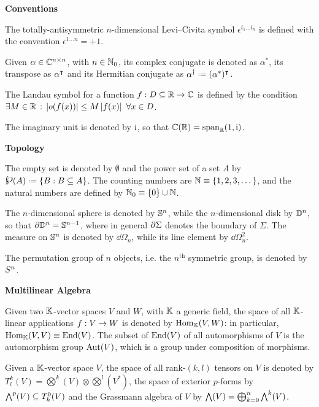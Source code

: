 
\textbf{\sffamily Conventions}

The totally-antisymmetric $ n $-dimensional Levi--Civita symbol $ \epsilon^{i_1 \dots i_n} $ is defined with the convention $ \epsilon^{1 \dots n} = +1 $.

Given $ \alpha \in \mathbb{C}^{n \times n} $, with $ n \in \mathbb{N}_0 $, its complex conjugate is denoted as $ \alpha^* $, its transpose as $ \alpha^\intercal $ and its Hermitian conjugate as $ \alpha\dg \defeq (\alpha^*)\tsp $.

The Landau symbol for a function $ f : D \subseteq \mathbb{R} \rightarrow \mathbb{C} $ is defined by the condition $ \exists M \in \mathbb{R} \,:\, \left\lvert o(f(x))\right\rvert \leq M \left\lvert f(x)\right\rvert \,\,\forall x \in D $.

The imaginary unit is denoted by $ \mathrm{i} $, so that $ \mathbb{C}(\mathbb{R}) = \operatorname{span}_{\mathbb{R}}(1,\mathrm{i}) $.

\textbf{\sffamily Topology}

The empty set is denoted by $ \emptyset $ and the power set of a set $ A $ by $ \pwst{A} \defeq \{B : B \ssq A\} $. The counting numbers are $ \mathbb{N} \equiv \{1,2,3,\dots\} $, and the natural numbers are defined by $ \mathbb{N}_0 \equiv \{0\} \cup \mathbb{N} $.

The $ n $-dimensional sphere is denoted by $ \mathbb{S}^{n} $, while the $ n $-dimensional disk by $ \mathbb{D}^{n} $, so that $ \partial \mathbb{D}^{n} = \mathbb{S}^{n-1} $, where in general $ \partial \Sigma $ denotes the boundary of $ \Sigma $. The measure on $ \mathbb{S}^{n} $ is denoted by $ \dd \Omega_n $, while its line element by $ \dd \Omega_n^2 $.

The permutation group of $ n $ objects, i.e. the $ n^\text{th} $ symmetric group, is denoted by $ S^{n} $.

\textbf{\sffamily Multilinear Algebra}

Given two $ \mathbb{K} $-vector spaces $ V $ and $ W $, with $ \mathbb{K} $ a generic field, the space of all $ \mathbb{K} $-linear applications $ f : V \rightarrow W $ is denoted by $ \operatorname{Hom}_{\mathbb{K}}(V,W) $: in particular, $ \operatorname{Hom}_{\mathbb{K}}(V , V) \equiv \operatorname{End}(V) $. The subset of $ \operatorname{End}(V) $ of all automorphisms of $ V $ is the automorphism group $ \operatorname{Aut}(V) $, which is a group under composition of morphisms.

Given a $ \mathbb{K} $-vector space $ V $, the space of all rank-$ (k,l) $ tensors on $ V $ is denoted by $ T^k_l(V) = \bigotimes^k (V) \otimes \bigotimes^l (V^*) $, the space of exterior $ p $-forms by $ {\bigwedge}^{p}(V) \subseteq T^0_k(V) $ and the Grassmann algebra of $ V $ by $ \bigwedge(V) = \bigoplus_{k = 0}^n {\bigwedge}^{k}(V) $.

